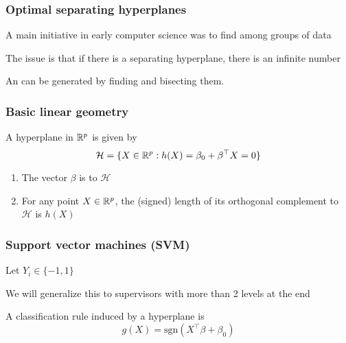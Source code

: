 \documentclass[12pt]{beamer}
\begin{document}
\title{}
\subtitle{\classTitle}
\date{}



\begin{frame}
\maketitle
%
\organization
%
\end{frame}

\begin{frame}
\frametitle{Optimal separating hyperplanes}
A main initiative in early computer science was to find 
among groups of data

\vsp

The issue is that if there is a separating hyperplane, there is an infinite number

\vsp
An  can be generated by finding  and
bisecting them.

\end{frame}

\begin{frame}
\frametitle{Basic linear geometry}
A hyperplane in $\mathbb{R}^p$ is  given by 
\[
\mathcal{H} = \{X \in \mathbb{R}^p :  h(X) = \beta_0 + \beta^{\top}X = 0\}
\]

\vsp
\begin{enumerate}
\item The vector $\beta$ is  to $\mathcal{H}$


\item {} For any point $X \in \mathbb{R}^p$, the (signed) length of its orthogonal complement
to $\mathcal{H}$ is $h(X)$

\end{enumerate}
\end{frame}


\begin{frame}
\frametitle{Support vector machines (SVM)}
Let $Y_i \in \{-1,1\}$


\vsp
We will generalize this to supervisors with more than 2 levels at the end

\vsp
A classification rule induced by a hyperplane is
\[
g(X) = \textrm{sgn}(X^{\top}\beta + \beta_0)
\]
\end{frame}
\end{document}
